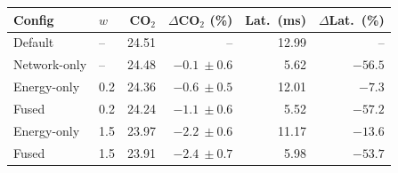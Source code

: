 \begin{tabular}{@{}llrrrr@{}}
\toprule
Config & $w$ & CO$_2$ & $\Delta$CO$_2$ (\%) & Lat.\ (ms) & $\Delta$Lat.\ (\%) \\
\midrule
Default & -- & 24.51 & -- & 12.99 & -- \\
Network-only & -- & 24.48 & $-0.1\ \pm0.6$ & 5.62 & $-56.5$ \\
Energy-only & 0.2 & 24.36 & $-0.6\ \pm0.5$ & 12.01 & $-7.3$ \\
Fused & 0.2 & 24.24 & $-1.1\ \pm0.6$ & 5.52 & $-57.2$ \\
\midrule
Energy-only & 1.5 & 23.97 & $-2.2\ \pm0.6$ & 11.17 & $-13.6$ \\
Fused & 1.5 & 23.91 & $-2.4\ \pm0.7$ & 5.98 & $-53.7$ \\
\bottomrule
\end{tabular}
